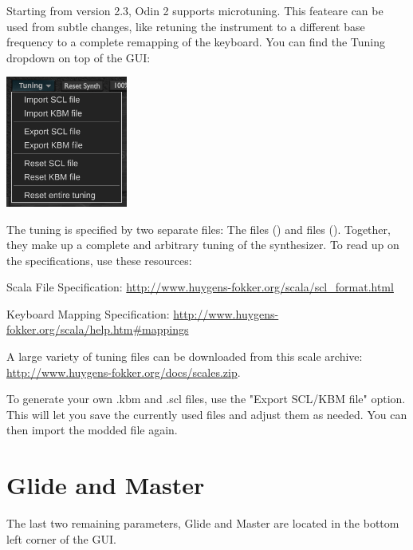 Starting from version 2.3, Odin 2 supports microtuning. This feateare can be used from subtle changes, like retuning the instrument to a different base frequency to a complete remapping of the keyboard.
You can find the Tuning dropdown on top of the GUI:

\begin{center}
    \includegraphics[width=0.3\textwidth]{graphics/microtuning.png}
\end{center}

The tuning is specified by two separate files: The  files () and  files (). Together, they make up a complete and arbitrary tuning of the synthesizer.
To read up on the specifications, use these resources:

\vspace{3mm}
Scala File Specification: \url{http://www.huygens-fokker.org/scala/scl_format.html}

\vspace{3mm}
Keyboard Mapping Specification: \url{http://www.huygens-fokker.org/scala/help.htm#mappings}

\vspace{3mm}
A large variety of tuning files can be downloaded from this scale archive: \url{http://www.huygens-fokker.org/docs/scales.zip}.

\vspace{3mm}
To generate your own .kbm and .scl files, use the "Export SCL/KBM file" option. This will let you save the currently used files and adjust them as needed. You can then import the modded file again.









\section{Glide and Master}
\label{glide}

The last two remaining parameters, Glide and Master are located in the bottom left corner of the GUI.

